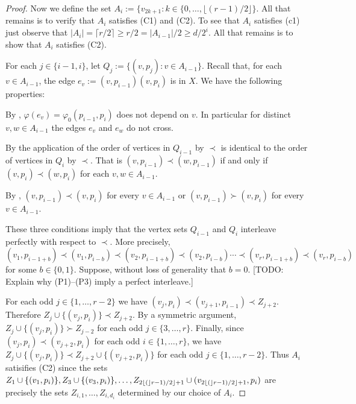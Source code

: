 \documentclass[kpfonts]{patmorin}
\begin{document}
\begin{proof}
    Now we define the set $A_i:=\{v_{2k+1}:k\in\{0,\ldots,\lfloor(r-1)/2\rfloor\}$.  All that remains is to verify that $A_i$ satisfies (C1) and (C2).  To see that $A_i$ satisfies (c1) just observe that $|A_i|=\lceil r/2\rceil \ge r/2= |A_{i-1}|/2\ge d/2^{i}$.  All that remains is to show that $A_i$ satisfies (C2).

    For each $j\in\{i-1,i\}$, let $Q_j:=\{(v,p_j):v\in A_{i-1}\}$.
    Recall that, for each $v\in A_{i-1}$, the edge $e_v:=(v,p_{i-1})(v,p_i)$ is in $X$.  We have the following properties:
    \begin{compactenum}[(P1)]
        \item By , $\varphi(e_v)=\varphi_0(p_{i-1},p_i)$ does not depend on $v$.  In particular for distinct $v,w\in A_{i-1}$ the edges $e_v$ and $e_w$ do not cross.
        \item By the application of  the order of vertices in $Q_{i-1}$ by $\prec$ is identical to the order of vertices in $Q_i$ by $\prec$.  That is $(v,p_{i-1})\prec (w,p_{i-1})$ if and only if $(v,p_{i})\prec (w,p_{i})$ for each $v,w\in A_{i-1}$.
        \item By , $(v,p_{i-1})\prec (v,p_i)$ for every $v\in A_{i-1}$ or $(v,p_{i-1})\succ (v,p_i)$ for every $v\in A_{i-1}$.
    \end{compactenum}
    These three conditions imply that the vertex sets $Q_{i-1}$ and $Q_{i}$ interleave perfectly with respect to $\prec$. More precisely,
    \[
        (v_1,p_{i-1+b})\prec (v_1,p_{i-b}) \prec (v_2,p_{i-1+b}) \prec (v_2,p_{i-b}) \cdots \prec (v_r,p_{i-1+b}) \prec (v_r,p_{i-b})
    \]
    for some $b\in\{0,1\}$.  Suppose, without loss of generality that $b=0$. [TODO: Explain why (P1)--(P3) imply a perfect interleave.]

    For each odd $j\in\{1,\ldots,r-2\}$ we have $(v_j,p_i)\prec (v_{j+1},p_{i-1}) \prec Z_{j+2}$.  Therefore $Z_j\cup\{(v_j,p_i)\} \prec Z_{j+2}$.  By a symmetric argument, $Z_j\cup\{(v_j,p_i)\} \succ Z_{j-2}$ for each odd $j\in\{3,\ldots,r\}$.  Finally, since $(v_{j},p_i)\prec (v_{j+2},p_i)$ for each odd $i\in\{1,\ldots,r\}$, we have $Z_{j}\cup\{(v_j,p_i)\} \prec Z_{j+2}\cup\{(v_{j+2},p_i)\}$ for each odd $j\in\{1,\ldots,r-2\}$.  Thus $A_i$ satisifies (C2) since the sets $Z_1\cup\{(v_1,p_i)\},Z_3\cup\{(v_3,p_i)\},\ldots,Z_{2{\lfloor ( \rfloor}r-1)/2\rfloor+1} \cup (v_{2{\lfloor ( \rfloor}r-1)/2\rfloor+1},p_i)$ are precisely the sets $Z_{i,1},\ldots,Z_{i,d_i}$ determined by our choice of $A_i$.
\end{proof}
\end{document}
